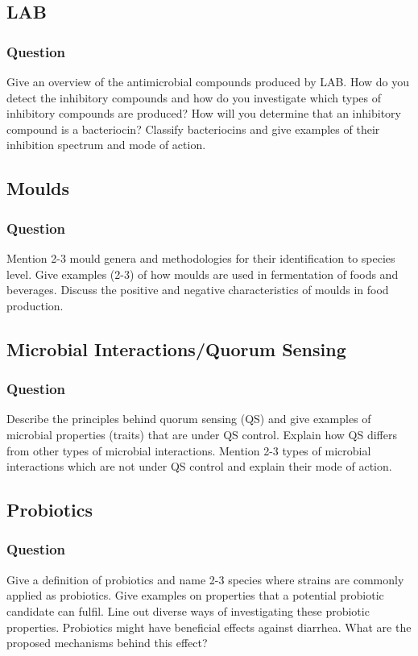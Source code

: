 \subsection{LAB}
\subsubsection*{Question}
Give an overview of the antimicrobial compounds produced by LAB. How do you detect the inhibitory compounds and how do you investigate which types of inhibitory compounds are produced? How will you determine that an inhibitory compound is a bacteriocin? Classify bacteriocins and give examples of their inhibition spectrum and mode of action. 

\subsection{Moulds}
\subsubsection*{Question}
Mention 2-3 mould genera and methodologies for their identification to species level. Give examples (2-3) of how moulds are used in fermentation of foods and beverages. Discuss the positive and negative characteristics of moulds in food production. 

\subsection{Microbial Interactions/Quorum Sensing}
\subsubsection*{Question}
Describe the principles behind quorum sensing (QS) and give examples of microbial properties (traits) that are under QS control. Explain how QS differs from other types of microbial interactions. Mention 2-3 types of microbial interactions which are not under QS control and explain their mode of action.  

\subsection{Probiotics}
\subsubsection*{Question}
Give a definition of probiotics and name 2-3 species where strains are commonly applied as probiotics. Give examples on properties that a potential probiotic candidate can fulfil. Line out diverse ways of investigating these probiotic properties. Probiotics might have beneficial effects against diarrhea. What are the proposed mechanisms behind this effect?

